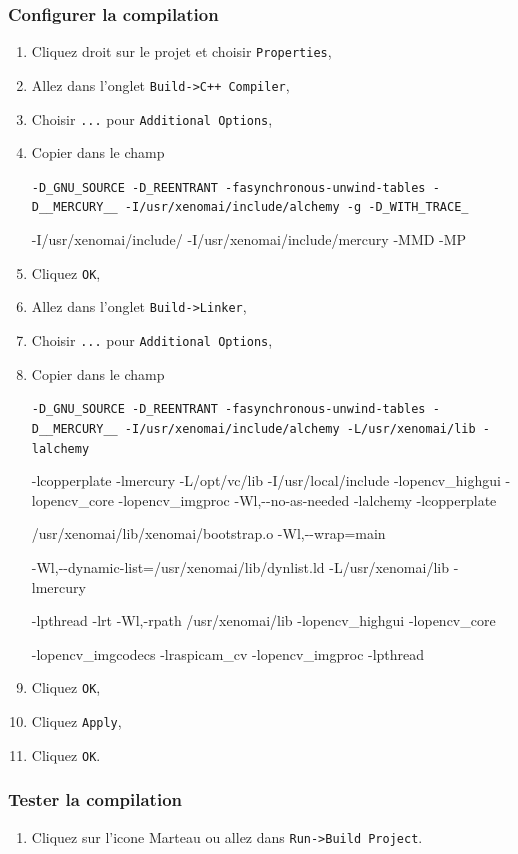 \documentclass[11pt]{paper}
\begin{document}
\subsubsection{Configurer la compilation}

\begin{enumerate}
\item Cliquez droit sur le projet et choisir {\tt Properties},
\item Allez dans l'onglet {\tt Build->C++ Compiler},
\item Choisir {\tt ...} pour {\tt Additional Options},
\item Copier dans le champ {\tt -D\_GNU\_SOURCE -D\_REENTRANT -fasynchronous-unwind-tables -D\_\_MERCURY\_\_ -I/usr/xenomai/include/alchemy -g -D\_WITH\_TRACE\_ 

-I/usr/xenomai/include/ -I/usr/xenomai/include/mercury -MMD -MP} 
\item Cliquez {\tt OK},
\item Allez dans l'onglet {\tt Build->Linker},
\item Choisir {\tt ...} pour {\tt Additional Options},
\item Copier dans le champ {\tt  -D\_GNU\_SOURCE -D\_REENTRANT -fasynchronous-unwind-tables -D\_\_MERCURY\_\_ -I/usr/xenomai/include/alchemy -L/usr/xenomai/lib -lalchemy 

-lcopperplate -lmercury -L/opt/vc/lib -I/usr/local/include -lopencv\_highgui -lopencv\_core -lopencv\_imgproc -Wl,{-}{-}no-as-needed -lalchemy -lcopperplate 

/usr/xenomai/lib/xenomai/bootstrap.o -Wl,{-}{-}wrap=main 

-Wl,{-}{-}dynamic-list=/usr/xenomai/lib/dynlist.ld -L/usr/xenomai/lib -lmercury 

-lpthread -lrt -Wl,-rpath /usr/xenomai/lib -lopencv\_highgui -lopencv\_core 

-lopencv\_imgcodecs -lraspicam\_cv -lopencv\_imgproc -lpthread} 
\item Cliquez {\tt OK},
\item Cliquez {\tt Apply},
\item Cliquez {\tt OK}.
\end{enumerate}

\subsubsection{Tester la compilation}

\begin{enumerate}
\item Cliquez sur l'icone \og Marteau \fg ou allez dans {\tt Run->Build Project}.
\end{enumerate}
\end{document}
